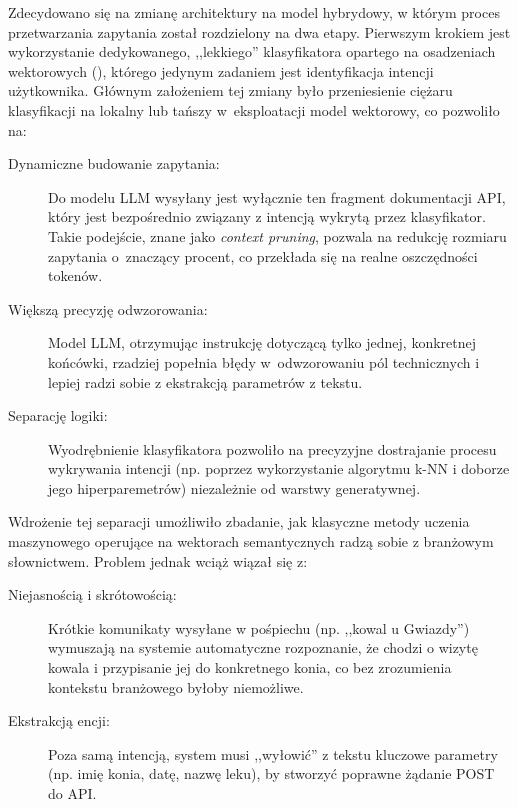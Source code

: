 Zdecydowano się na zmianę architektury na model hybrydowy, w którym proces przetwarzania zapytania został rozdzielony na dwa etapy. Pierwszym krokiem jest wykorzystanie dedykowanego, ,,lekkiego'' klasyfikatora opartego na osadzeniach wektorowych (), którego jedynym zadaniem jest identyfikacja intencji użytkownika.
Głównym założeniem tej zmiany było przeniesienie ciężaru klasyfikacji na lokalny lub tańszy w~eksploatacji model wektorowy, co pozwoliło na:

\begin{description}
	\item[Dynamiczne budowanie zapytania:] Do modelu LLM wysyłany jest wyłącznie ten fragment dokumentacji API, który jest bezpośrednio związany z intencją wykrytą przez klasyfikator. Takie podejście, znane jako \textit{context pruning}, pozwala na redukcję rozmiaru zapytania o~znaczący procent, co przekłada się na realne oszczędności tokenów.
    
	\item[Większą precyzję odwzorowania:] Model LLM, otrzymując instrukcję dotyczącą tylko jednej, konkretnej końcówki, rzadziej popełnia błędy w~odwzorowaniu pól technicznych i lepiej radzi sobie z ekstrakcją parametrów z tekstu.
    
	\item[Separację logiki:] Wyodrębnienie klasyfikatora pozwoliło na precyzyjne dostrajanie procesu wykrywania intencji (np. poprzez wykorzystanie algorytmu k-NN i doborze jego hiperparemetrów) niezależnie od warstwy generatywnej.
\end{description}

Wdrożenie tej separacji umożliwiło zbadanie, jak klasyczne metody uczenia maszynowego operujące na wektorach semantycznych radzą sobie z branżowym słownictwem.
Problem jednak wciąż wiązał się z:

\begin{description}
    \item[Niejasnością i skrótowością:] Krótkie komunikaty wysyłane w pośpiechu (np. ,,kowal u Gwiazdy'') wymuszają na systemie automatyczne rozpoznanie, że chodzi o wizytę kowala i przypisanie jej do konkretnego konia, co bez zrozumienia kontekstu branżowego byłoby niemożliwe.
    \item[Ekstrakcją encji:] Poza samą intencją, system musi ,,wyłowić'' z tekstu kluczowe parametry (np. imię konia, datę, nazwę leku), by stworzyć poprawne żądanie POST do API.
\end{description}

